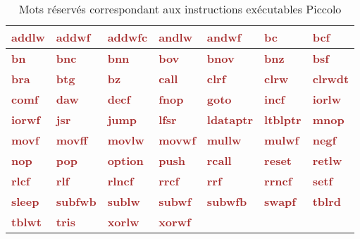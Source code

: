 \newcommand\keyWordInstruction[1]{\textcolor{brown}{\bf#1}}

\begin{table}[ht]
  \centering
\begin{tabular}{|l|l|l|l|l|l|l|}
  \hline
    \keyWordInstruction{addlw} & \keyWordInstruction{addwf} & \keyWordInstruction{addwfc} & \keyWordInstruction{andlw} & \keyWordInstruction{andwf} & \keyWordInstruction{bc} & \keyWordInstruction{bcf} \\
  \hline
    \keyWordInstruction{bn} & \keyWordInstruction{bnc} & \keyWordInstruction{bnn} & \keyWordInstruction{bov} & \keyWordInstruction{bnov} & \keyWordInstruction{bnz} & \keyWordInstruction{bsf} \\
  \hline
    \keyWordInstruction{bra} & \keyWordInstruction{btg} & \keyWordInstruction{bz} & \keyWordInstruction{call} & \keyWordInstruction{clrf} & \keyWordInstruction{clrw} & \keyWordInstruction{clrwdt} \\
  \hline
    \keyWordInstruction{comf} & \keyWordInstruction{daw} & \keyWordInstruction{decf} & \keyWordInstruction{fnop} & \keyWordInstruction{goto} & \keyWordInstruction{incf} & \keyWordInstruction{iorlw} \\
  \hline
    \keyWordInstruction{iorwf} & \keyWordInstruction{jsr} & \keyWordInstruction{jump} & \keyWordInstruction{lfsr} & \keyWordInstruction{ldataptr} & \keyWordInstruction{ltblptr} & \keyWordInstruction{mnop} \\
  \hline
    \keyWordInstruction{movf} & \keyWordInstruction{movff} & \keyWordInstruction{movlw} & \keyWordInstruction{movwf} & \keyWordInstruction{mullw} & \keyWordInstruction{mulwf} & \keyWordInstruction{negf} \\
  \hline
    \keyWordInstruction{nop} & \keyWordInstruction{pop} & \keyWordInstruction{option} & \keyWordInstruction{push} & \keyWordInstruction{rcall} & \keyWordInstruction{reset} & \keyWordInstruction{retlw} \\
  \hline
    \keyWordInstruction{rlcf} & \keyWordInstruction{rlf} & \keyWordInstruction{rlncf} & \keyWordInstruction{rrcf} & \keyWordInstruction{rrf} & \keyWordInstruction{rrncf} & \keyWordInstruction{setf} \\
  \hline
    \keyWordInstruction{sleep} & \keyWordInstruction{subfwb} & \keyWordInstruction{sublw} & \keyWordInstruction{subwf} & \keyWordInstruction{subwfb} & \keyWordInstruction{swapf} & \keyWordInstruction{tblrd}\\
  \hline
    \keyWordInstruction{tblwt} & \keyWordInstruction{tris} & \keyWordInstruction{xorlw} & \keyWordInstruction{xorwf} & & & \\
  \hline
\end{tabular}
  \caption{Mots réservés correspondant aux instructions exécutables Piccolo}
\end{table}




